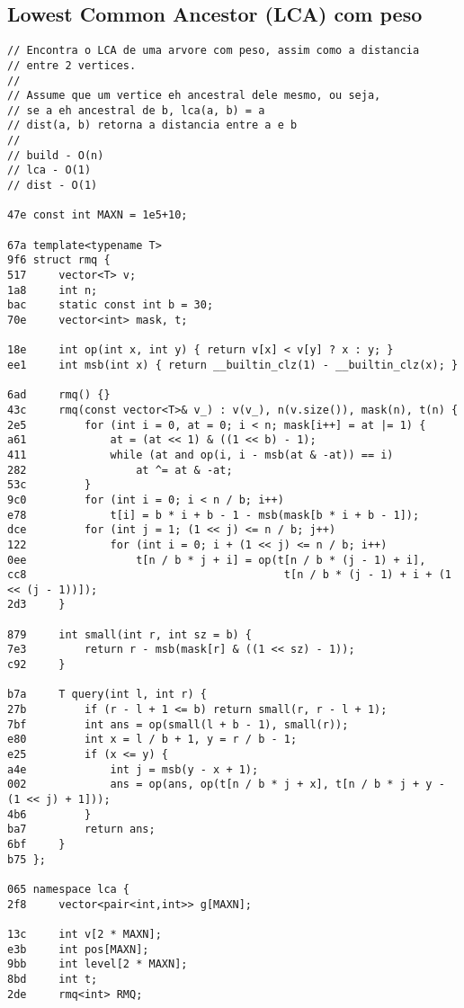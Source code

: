 \documentclass[11pt, a4paper, twoside]{article}
\begin{document}
\subsection{Lowest Common Ancestor (LCA) com peso}
\begin{lstlisting}
// Encontra o LCA de uma arvore com peso, assim como a distancia 
// entre 2 vertices.
//
// Assume que um vertice eh ancestral dele mesmo, ou seja,
// se a eh ancestral de b, lca(a, b) = a
// dist(a, b) retorna a distancia entre a e b
//
// build - O(n)
// lca - O(1)
// dist - O(1)

47e const int MAXN = 1e5+10;

67a template<typename T> 
9f6 struct rmq {
517     vector<T> v;
1a8     int n; 
bac     static const int b = 30;
70e     vector<int> mask, t;
    
18e     int op(int x, int y) { return v[x] < v[y] ? x : y; }
ee1     int msb(int x) { return __builtin_clz(1) - __builtin_clz(x); }
        
6ad     rmq() {}
43c     rmq(const vector<T>& v_) : v(v_), n(v.size()), mask(n), t(n) {
2e5         for (int i = 0, at = 0; i < n; mask[i++] = at |= 1) {
a61             at = (at << 1) & ((1 << b) - 1);
411             while (at and op(i, i - msb(at & -at)) == i)
282                 at ^= at & -at;
53c         }
9c0         for (int i = 0; i < n / b; i++) 
e78             t[i] = b * i + b - 1 - msb(mask[b * i + b - 1]);
dce         for (int j = 1; (1 << j) <= n / b; j++) 
122             for (int i = 0; i + (1 << j) <= n / b; i++)
0ee                 t[n / b * j + i] = op(t[n / b * (j - 1) + i],
cc8                                        t[n / b * (j - 1) + i + (1 << (j - 1))]);
2d3     }
        
879     int small(int r, int sz = b) { 
7e3         return r - msb(mask[r] & ((1 << sz) - 1)); 
c92     }
        
b7a     T query(int l, int r) {
27b         if (r - l + 1 <= b) return small(r, r - l + 1);
7bf         int ans = op(small(l + b - 1), small(r));
e80         int x = l / b + 1, y = r / b - 1;
e25         if (x <= y) {
a4e             int j = msb(y - x + 1);
002             ans = op(ans, op(t[n / b * j + x], t[n / b * j + y - (1 << j) + 1]));
4b6         }
ba7         return ans;
6bf     }
b75 };

065 namespace lca {
2f8     vector<pair<int,int>> g[MAXN];
        
13c     int v[2 * MAXN];
e3b     int pos[MAXN];
9bb     int level[2 * MAXN];
8bd     int t;
2de     rmq<int> RMQ;
        

\end{lstlisting}
\end{document}
